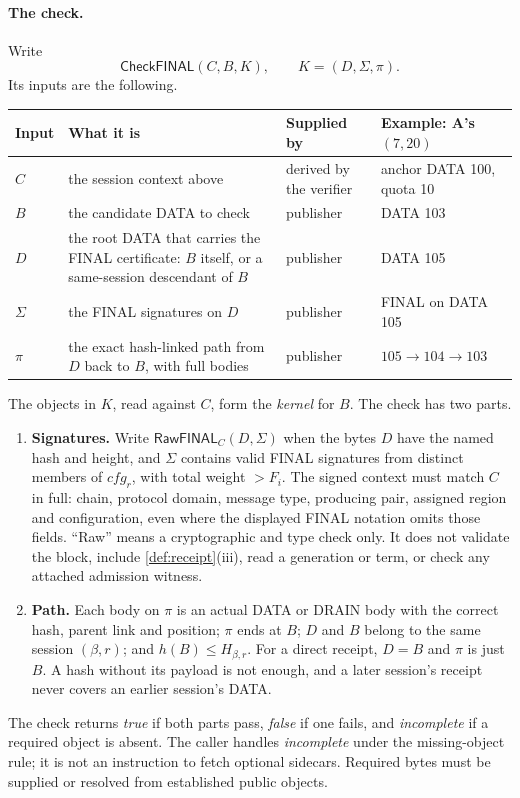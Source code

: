 \documentclass[11pt,a4paper]{article}
\newcommand{\tagg}[1]{\ensuremath{\mathsf{#1}}}
\newcommand{\defterm}[1]{\textcolor{rrBlue}{\textit{#1}}}
\newcounter{protocol}
\begin{document}
\paragraph{The check.}
Write
\[
 \tagg{CheckFINAL}(C,B,K),\qquad K=(D,\Sigma,\pi).
\]
Its inputs are the following.
\begin{center}\small
\begin{tabularx}{\linewidth}{@{}>{\raggedright\arraybackslash}p{.05\linewidth}Y>{\raggedright\arraybackslash}p{.15\linewidth}>{\raggedright\arraybackslash}p{.22\linewidth}@{}}\toprule
Input & What it is & Supplied by & Example: A's $(7,20)$\\\midrule
$C$ & the session context above & derived by the verifier & anchor DATA 100, quota 10\\
$B$ & the candidate DATA to check & publisher & DATA 103\\
$D$ & the root DATA that carries the FINAL certificate: $B$ itself, or a same-session descendant of $B$ & publisher & DATA 105\\
$\Sigma$ & the FINAL signatures on $D$ & publisher & FINAL on DATA 105\\
$\pi$ & the exact hash-linked path from $D$ back to $B$, with full bodies & publisher & $105\to104\to103$\\\bottomrule
\end{tabularx}
\end{center}
The objects in $K$, read against $C$, form the \defterm{kernel} for $B$.
The check has two parts.
\begin{enumerate}[label=(\arabic*),itemsep=2pt]
\item \textbf{Signatures.} Write $\tagg{RawFINAL}_C(D,\Sigma)$ when the
bytes $D$ have the named hash and height, and $\Sigma$ contains valid
FINAL signatures from distinct members of $\mathit{cfg}_r$, with total
weight $>F_i$. The signed context must match $C$ in full: chain,
protocol domain, message type, producing pair, assigned region and
configuration, even where the displayed FINAL notation omits those
fields. ``Raw'' means a cryptographic and type check only. It does not
validate the block, include \cref{def:receipt}(iii), read a generation
or term, or check any attached admission witness.
\item \textbf{Path.} Each body on $\pi$ is an actual DATA or DRAIN body
with the correct hash, parent link and position; $\pi$ ends at $B$; $D$
and $B$ belong to the same session $(\beta,r)$; and
$h(B)\le H_{\beta,r}$. For a direct receipt, $D=B$ and $\pi$ is just $B$.
A hash without its payload is not enough, and a later session's receipt
never covers an earlier session's DATA.
\end{enumerate}
The check returns \emph{true} if both parts pass, \emph{false} if one
fails, and \emph{incomplete} if a required object is absent. The caller
handles \emph{incomplete} under the missing-object rule; it is not an
instruction to fetch optional sidecars. Required bytes must be supplied
or resolved from established public objects.
\end{document}
